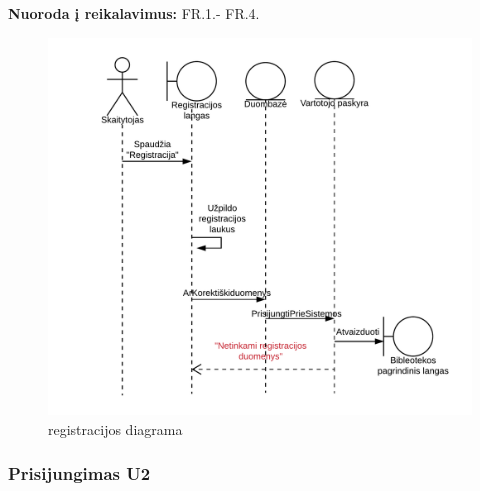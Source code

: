\documentclass{VUMIFPSkursinis}
\begin{document}
	\textbf{Nuoroda į reikalavimus:} FR.1.- FR.4.

\begin{figure}[H]
\label{fig:regdiag}
    \centering
    \includegraphics[width=1\textwidth]{Sekos_diagramos/SD_Registracija}
	\caption{registracijos diagrama}  
\end{figure}

\subsubsection{Prisijungimas U2} 

\end{document}
